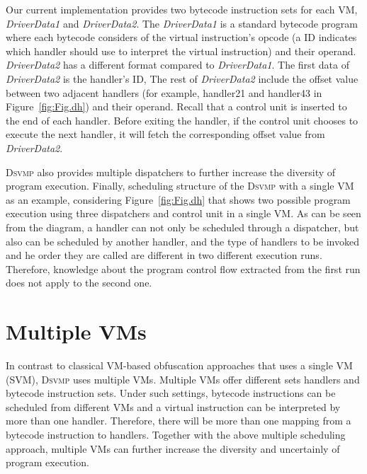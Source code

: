 \documentclass[preprint,12pt,3p]{elsarticle}
\newcommand{\DSVMP}{\textsc{Dsvmp}\xspace}
\begin{document}
Our current implementation provides two bytecode instruction sets for each VM,
\emph{DriverData1} and \emph{DriverData2}. The \emph{DriverData1} is a
standard bytecode program where each bytecode considers of the
virtual instruction's opcode (a ID indicates which handler should use to
interpret the virtual instruction) and their operand. \emph{DriverData2} has a different
format compared to \emph{DriverData1}. The first data of \emph{DriverData2}
is the handler's ID, The rest of \emph{DriverData2} include the
offset value between two adjacent handlers (for example, handler21 and handler43 in Figure~\ref{fig:Fig.dh}) and their operand.
Recall that a control unit is inserted to the end of each handler. Before exiting the handler,
if the control unit chooses to execute the next handler, it will fetch the corresponding offset value from \emph{DriverData2}.

\DSVMP also provides multiple dispatchers to further increase the diversity of program execution.
Finally, scheduling structure of the \DSVMP with a single VM as an example, considering Figure~\ref{fig:Fig.dh} that
shows two possible program execution using three dispatchers and control unit in a single VM. As can be seen
from the diagram, a handler can not only be scheduled through a dispatcher, but also can be scheduled by another handler,
and the type of handlers to be invoked and he order they are called are different in two different execution runs.
Therefore, knowledge about the program control flow extracted from the first run does not apply to the second one.


\section{Multiple VMs}\label{sec:mvm}
In contrast to classical VM-based obfuscation approaches that uses a single VM (SVM), \DSVMP uses multiple VMs.
Multiple VMs offer different sets handlers and bytecode instruction sets. Under such settings,
bytecode instructions can be scheduled from different VMs and a virtual instruction can be interpreted by more than one handler.
Therefore, there will be more than one mapping from a bytecode instruction to handlers.
Together with the above multiple scheduling approach, multiple VMs can further increase the diversity and uncertainly of program execution.
\end{document}

